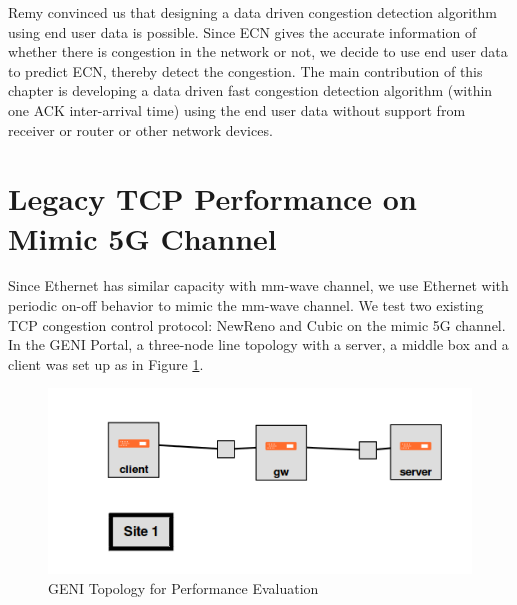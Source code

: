 \par Remy convinced us that designing a data driven congestion detection algorithm using end user data is possible. Since ECN gives the accurate information of whether there is congestion in the network or not, we decide to use end user data to predict ECN, thereby detect the congestion. The main contribution of this chapter is developing a data driven fast congestion detection algorithm (within one ACK inter-arrival time) using the end user data without support from receiver or router or other network devices.

\section{Legacy TCP Performance on Mimic 5G Channel}
\label{legacy}
\par Since Ethernet has similar capacity with mm-wave channel, we use Ethernet with periodic on-off behavior to mimic the mm-wave channel. We test two existing TCP congestion control protocol: NewReno and Cubic on the mimic 5G channel. In the GENI Portal, a three-node line topology with a server, a middle box and a client was set up as in Figure \ref{genitopo}. 
\begin{figure}
\centering
\includegraphics[width=14cm]{topologyGeni.png}
\caption{GENI Topology for Performance Evaluation}
\label{genitopo}
\end{figure}
